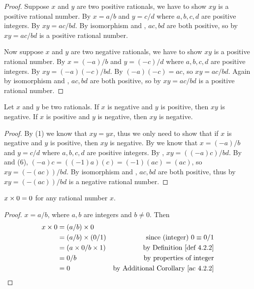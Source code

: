 \begin{proof}
Suppose \(x\) and \(y\) are two positive rationals, we have to show \(xy\) is a positive rational number.
By  \(x = a / b\) and \(y = c / d\) where \(a, b, c, d\) are positive integers.
By  \(xy = ac / bd\).
By isomorphism and , \(ac, bd\) are both positive, so by  \(xy = ac / bd\) is a positive rational number.

Now suppose \(x\) and \(y\) are two negative rationals, we have to show \(xy\) is a positive rational number.
By  \(x = (-a) / b\) and \(y = (-c) / d\) where \(a, b, c, d \) are positive integers.
By  \(xy = (-a)(-c) / bd\).
By  \((-a)(-c) = ac\), so \(xy = ac / bd\).
Again by isomorphism and , \(ac, bd\) are both positive, so by  \(xy = ac / bd\) is a positive rational number.
\end{proof}

\begin{additional corollary} \label{ac 4.2.6}
Let \(x\) and \(y\) be two rationals.
If \(x\) is negative and \(y\) is positive, then \(xy\) is negative.
If \(x\) is positive and \(y\) is negative, then \(xy\) is negative.
\end{additional corollary}

\begin{proof}
By (1) we know that \(xy = yx\), thus we only need to show that if \(x\) is negative and \(y\) is positive, then \(xy\) is negative.
By  we know that \(x = (-a) / b\) and \(y = c / d\) where \(a, b, c, d\) are positive integers.
By , \(xy = ((-a)c) / bd\).
By  and (6), \((-a)c = ((-1)a)(c) = (-1)(ac) = (ac)\), so \(xy = (-(ac)) / bd\).
By isomorphism and , \(ac, bd\) are both positive, thus by  \(xy = (-(ac)) / bd\) is a negative rational number.
\end{proof}

\begin{additional corollary} \label{ac 4.2.7}
\(x \times 0 = 0\) for any rational number \(x\).
\end{additional corollary}

\begin{proof}
\(x = a / b\), where \(a, b\) are integers and \(b \neq 0\).
Then
\begin{align*}
    x \X 0 & = (a / b) \X 0 \\
           & = (a / b) \X (0 / 1) & \text{since (integer) \(0 \equiv 0 / 1\)} \\
           & = (a \X 0 / b \X 1) & \text{by \DEF{4.2.2}} \\
           & = 0 / b & \text{by properties of integer} \\
           & = 0 & \text{by \AC{4.2.2}} \\
\end{align*}
\end{proof}

